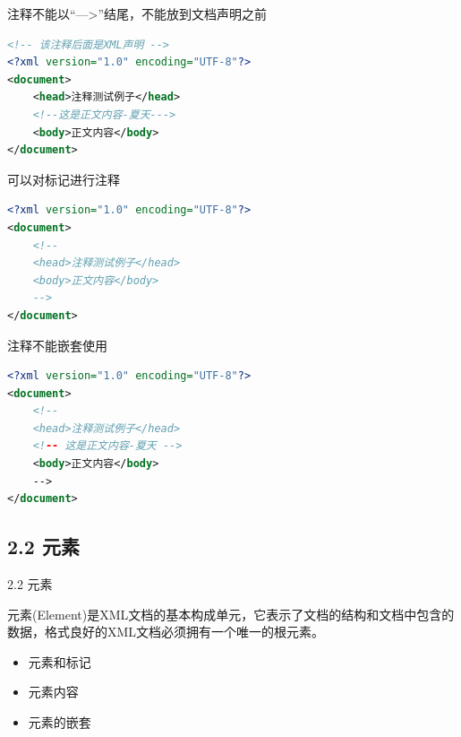 \begin{frame}[fragile]{注释不能以“--->”结尾，不能放到文档声明之前}
\begin{lstlisting}[tabsize=8, basicstyle=\small\tt, language=XML]
<!-- 该注释后面是XML声明 -->
<?xml version="1.0" encoding="UTF-8"?>
<document>
    <head>注释测试例子</head>
    <!--这是正文内容-夏天--->
    <body>正文内容</body>
</document>
\end{lstlisting}
\end{frame}


\begin{frame}[fragile]{可以对标记进行注释}
\begin{lstlisting}[tabsize=8, basicstyle=\small\tt, language=XML]
<?xml version="1.0" encoding="UTF-8"?>
<document>
    <!--
    <head>注释测试例子</head>
    <body>正文内容</body>
    -->
</document>
\end{lstlisting}
\end{frame}


\begin{frame}[fragile]{注释不能嵌套使用}
\begin{lstlisting}[tabsize=8, basicstyle=\small\tt, language=XML]
<?xml version="1.0" encoding="UTF-8"?>
<document>
    <!--
    <head>注释测试例子</head>
    <!-- 这是正文内容-夏天 -->
    <body>正文内容</body>
    -->
</document>
\end{lstlisting}
\end{frame}



\subsection{2.2 元素}

\begin{frame}{2.2 元素}
\par 元素(Element)是XML文档的基本构成单元，它表示了文档的结构和文档中包含的数据，格式良好的XML文档必须拥有一个唯一的根元素。
\begin{itemize}
\item 元素和标记
\item  元素内容
\item 元素的嵌套
\end{itemize}
\end{frame}

